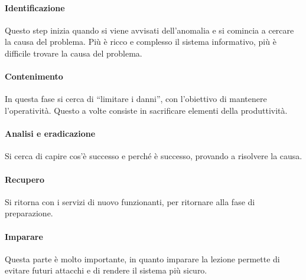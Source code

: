\paragraph*{Identificazione} Questo step inizia quando si viene
avvisati dell'anomalia e si comincia a cercare la causa del problema. Più è
ricco e complesso il sistema informativo, più è difficile trovare la causa del
problema.

\paragraph*{Contenimento} In questa fase si cerca di ``limitare i danni'', con
l'obiettivo di mantenere l'operatività. Questo a volte consiste in sacrificare
elementi della produttività.

\paragraph*{Analisi e eradicazione} Si cerca di capire cos'è successo e perché 
è successo, provando a risolvere la causa.

\paragraph*{Recupero} Si ritorna con i servizi di nuovo funzionanti, per
ritornare alla fase di preparazione.

\paragraph*{Imparare} Questa parte è molto importante, in quanto imparare la
lezione permette di evitare futuri attacchi e di rendere il sistema più sicuro.
